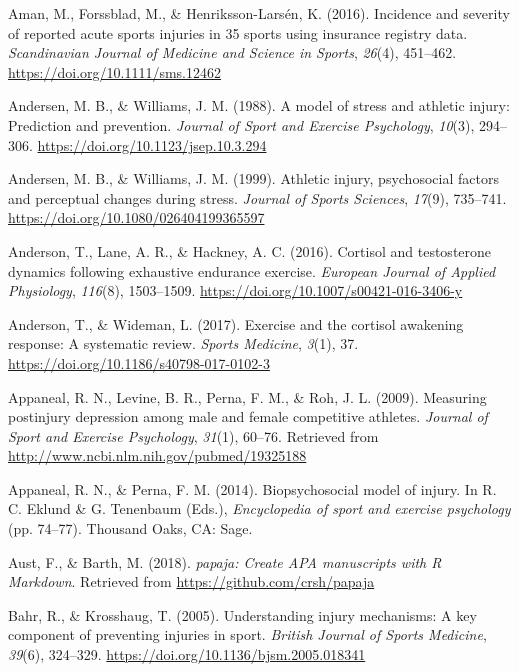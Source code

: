 \documentclass[man,floatsintext]{apa6}
\begin{document}
\leavevmode\hypertarget{ref-Aman2016}{}%
Aman, M., Forssblad, M., \& Henriksson-Larsén, K. (2016). Incidence and severity of reported acute sports injuries in 35 sports using insurance registry data. \emph{Scandinavian Journal of Medicine and Science in Sports}, \emph{26}(4), 451--462. \url{https://doi.org/10.1111/sms.12462}

\leavevmode\hypertarget{ref-Andersen1988}{}%
Andersen, M. B., \& Williams, J. M. (1988). A model of stress and athletic injury: Prediction and prevention. \emph{Journal of Sport and Exercise Psychology}, \emph{10}(3), 294--306. \url{https://doi.org/10.1123/jsep.10.3.294}

\leavevmode\hypertarget{ref-Andersen1999}{}%
Andersen, M. B., \& Williams, J. M. (1999). Athletic injury, psychosocial factors and perceptual changes during stress. \emph{Journal of Sports Sciences}, \emph{17}(9), 735--741. \url{https://doi.org/10.1080/026404199365597}

\leavevmode\hypertarget{ref-Anderson2016}{}%
Anderson, T., Lane, A. R., \& Hackney, A. C. (2016). Cortisol and testosterone dynamics following exhaustive endurance exercise. \emph{European Journal of Applied Physiology}, \emph{116}(8), 1503--1509. \url{https://doi.org/10.1007/s00421-016-3406-y}

\leavevmode\hypertarget{ref-Anderson2017}{}%
Anderson, T., \& Wideman, L. (2017). Exercise and the cortisol awakening response: A systematic review. \emph{Sports Medicine}, \emph{3}(1), 37. \url{https://doi.org/10.1186/s40798-017-0102-3}

\leavevmode\hypertarget{ref-Appaneal2009}{}%
Appaneal, R. N., Levine, B. R., Perna, F. M., \& Roh, J. L. (2009). Measuring postinjury depression among male and female competitive athletes. \emph{Journal of Sport and Exercise Psychology}, \emph{31}(1), 60--76. Retrieved from \url{http://www.ncbi.nlm.nih.gov/pubmed/19325188}

\leavevmode\hypertarget{ref-Appaneal2014}{}%
Appaneal, R. N., \& Perna, F. M. (2014). Biopsychosocial model of injury. In R. C. Eklund \& G. Tenenbaum (Eds.), \emph{Encyclopedia of sport and exercise psychology} (pp. 74--77). Thousand Oaks, CA: Sage.

\leavevmode\hypertarget{ref-R-papaja}{}%
Aust, F., \& Barth, M. (2018). \emph{papaja: Create APA manuscripts with R Markdown}. Retrieved from \url{https://github.com/crsh/papaja}

\leavevmode\hypertarget{ref-Bahr2005}{}%
Bahr, R., \& Krosshaug, T. (2005). Understanding injury mechanisms: A key component of preventing injuries in sport. \emph{British Journal of Sports Medicine}, \emph{39}(6), 324--329. \url{https://doi.org/10.1136/bjsm.2005.018341}
\end{document}
